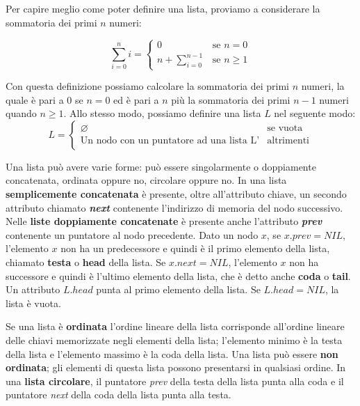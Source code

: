 Per capire meglio come poter definire una lista, proviamo a considerare la sommatoria dei primi $n$ numeri:

\begin{displaymath}
    \sum_{i=0}^{n} i = \left \lbrace \begin{array}{ll}
                            0 & \mbox{se } n = 0 \\
                            n + \displaystyle\sum_{i=0}^{n-1} & \mbox{se }n \geq 1
                        \end{array} \right.
\end{displaymath}

Con questa definizione possiamo calcolare la sommatoria dei primi $n$ numeri, la quale è pari a 0 se $n=0$ ed è pari a $n$ più la sommatoria dei primi $n-1$ numeri quando $n\geq 1$. Allo stesso modo, possiamo definire una lista $L$ nel seguente modo:
	\begin{equation}\label{definizione:listaconcatenata}
		L=\left\lbrace
		\begin{array}{lc}
			\varnothing & \mbox{se vuota}\\
			\mbox{Un nodo con un puntatore ad una lista L'} & \mbox{altrimenti}
		\end{array}
		\right.
	\end{equation}

Una lista può avere varie forme: può essere singolarmente o doppiamente concatenata, ordinata oppure no, circolare oppure no. In una lista \textbf{semplicemente concatenata} è presente, oltre all'attributo chiave, un secondo attributo chiamato \textit{\textbf{next}} contenente l'indirizzo di memoria del nodo successivo. Nelle \textbf{liste doppiamente concatenate} è presente anche l'attributo \textit{\textbf{prev}} contenente un puntatore al nodo precedente. Dato un nodo $x$, se $x.prev=NIL$, l'elemento $x$ non ha un predecessore e quindi è il primo elemento della lista, chiamato \textbf{testa} o \textbf{head} della lista. Se $x.next=NIL$, l'elemento $x$ non ha successore e quindi è l'ultimo elemento della lista, che è detto anche \textbf{coda} o \textbf{tail}. Un attributo $L.head$ punta al primo elemento della lista. Se $L.head=NIL$, la lista è vuota.

Se una lista è \textbf{ordinata} l'ordine lineare della lista corrisponde all'ordine lineare delle chiavi memorizzate negli elementi della lista; l'elemento minimo è la testa della lista e l'elemento massimo è la coda della lista. Una lista può essere \textbf{non ordinata}; gli elementi di questa lista possono presentarsi in qualsiasi ordine. In una \textbf{lista circolare}, il puntatore \textit{prev} della testa della lista punta alla coda e il puntatore \textit{next} della coda della lista punta alla testa.


